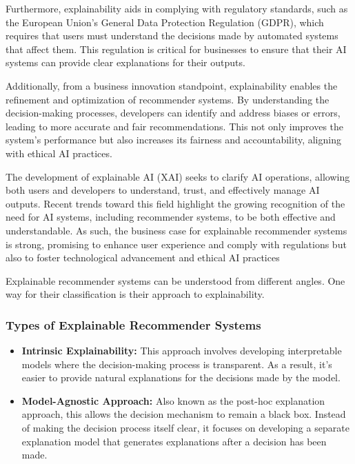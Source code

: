 Furthermore, explainability aids in complying with regulatory standards, such as
the European Union's General Data Protection Regulation (GDPR), which requires
that users must understand the decisions made by automated systems that affect
them. This regulation is critical for businesses to ensure that their AI systems
can provide clear explanations for their outputs.

Additionally, from a business innovation standpoint, explainability enables the refinement
and optimization of recommender systems. By understanding the decision-making
processes, developers can identify and address biases or errors, leading to more
accurate and fair recommendations. This not only improves the system's performance
but also increases its fairness and accountability, aligning with ethical AI
practices.

The development of explainable AI (XAI) seeks to clarify AI operations, allowing
both users and developers to understand, trust, and effectively manage AI outputs.
Recent trends toward this field highlight the growing recognition of the need
for AI systems, including recommender systems, to be both effective and
understandable. As such, the business case for explainable recommender systems
is strong, promising to enhance user experience and comply with regulations but also
to foster technological advancement and ethical AI practices \parencite{vultureanu-albisi_recommender_2021}

Explainable recommender systems can be understood from different angles. One way
for their classification is their approach to explainability.
\subsubsection{Types of Explainable Recommender Systems}

\begin{itemize}
	\item \textbf{Intrinsic Explainability:} This approach involves developing
		interpretable models where the decision-making process is transparent. As a result,
		it's easier to provide natural explanations for the decisions made by the
		model.

	\item \textbf{Model-Agnostic Approach:} Also known as the post-hoc explanation
		approach, this allows the decision mechanism to remain a black box. Instead
		of making the decision process itself clear, it focuses on developing a separate
		explanation model that generates explanations after a decision has been made.
\end{itemize}

